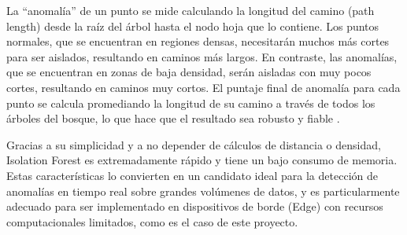 La ``anomalía'' de un punto se mide calculando la longitud del camino (path length) desde la raíz del árbol hasta el nodo hoja que lo contiene. Los puntos normales, que se encuentran en regiones densas, necesitarán muchos más cortes para ser aislados, resultando en caminos más largos. En contraste, las anomalías, que se encuentran en zonas de baja densidad, serán aisladas con muy pocos cortes, resultando en caminos muy cortos. El puntaje final de anomalía para cada punto se calcula promediando la longitud de su camino a través de todos los árboles del bosque, lo que hace que el resultado sea robusto y fiable \cite{liu2012isolation}.

Gracias a su simplicidad y a no depender de cálculos de distancia o densidad, Isolation Forest es extremadamente rápido y tiene un bajo consumo de memoria. Estas características lo convierten en un candidato ideal para la detección de anomalías en tiempo real sobre grandes volúmenes de datos, y es particularmente adecuado para ser implementado en dispositivos de borde (Edge) con recursos computacionales limitados, como es el caso de este proyecto.



